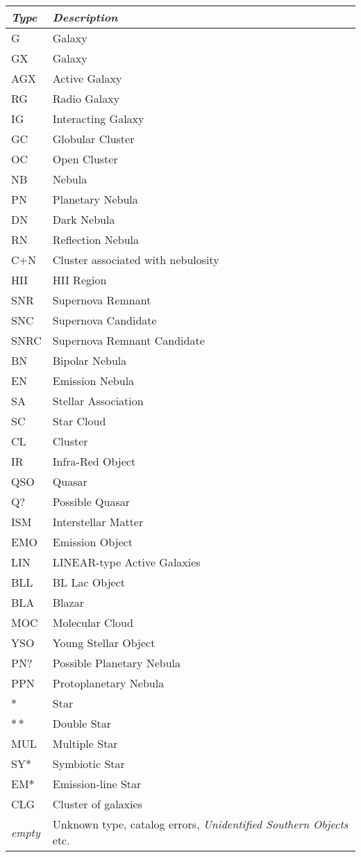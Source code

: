 \begin{longtable}{l|p{120mm}}
\toprule
\emph{Type} & \emph{Description}\\\midrule
G   & Galaxy\\
GX  & Galaxy\\
AGX & Active Galaxy\\
RG  & Radio Galaxy\\
IG  & Interacting Galaxy\\
GC  & Globular Cluster\\
OC  & Open Cluster\\
NB  & Nebula\\
PN  & Planetary Nebula\\
DN  & Dark Nebula\\
RN  & Reflection Nebula\\
C+N & Cluster associated with nebulosity\\
HII & HII Region\\
SNR & Supernova Remnant\\
SNC & Supernova Candidate\\
SNRC & Supernova Remnant Candidate\\
BN  & Bipolar Nebula\\
EN  & Emission Nebula\\
SA  & Stellar Association\\
SC  & Star Cloud\\
CL  & Cluster\\
IR  & Infra-Red Object\\
QSO & Quasar\\
Q?  & Possible Quasar\\
ISM & Interstellar Matter\\
EMO & Emission Object\\
LIN & LINEAR-type Active Galaxies\\
BLL & BL Lac Object\\
BLA & Blazar\\
MOC & Molecular Cloud\\
YSO & Young Stellar Object\\
PN? & Possible Planetary Nebula\\
PPN & Protoplanetary Nebula\\
$\ast$ & Star\\
$\ast\ast$ & Double Star\\
MUL & Multiple Star\\
SY$\ast$ & Symbiotic Star\\
EM$\ast$ & Emission-line Star\\
CLG & Cluster of galaxies\\
\emph{empty} & Unknown type, catalog errors, \emph{Unidentified Southern Objects} etc.\\
\bottomrule
\end{longtable}

